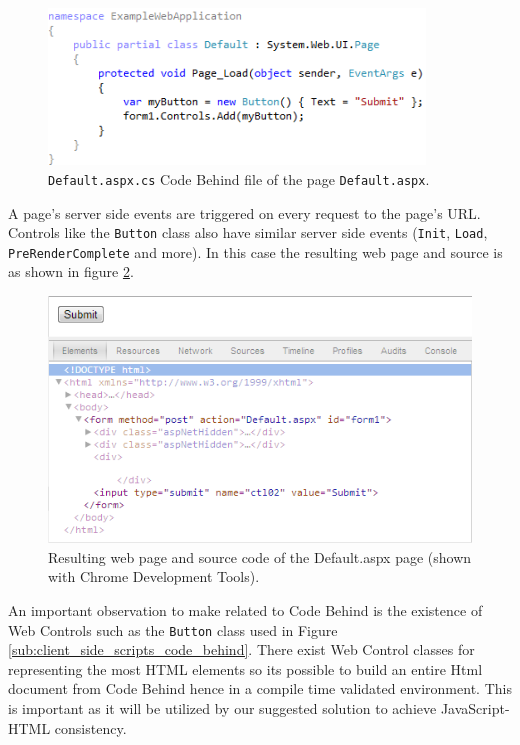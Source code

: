 				\begin{figure}[H]
					\includegraphics[width=10cm]{resources/images/CodeBehind.png}
				\caption{\texttt{Default.aspx.cs} Code Behind file of the page \texttt{Default.aspx}.}
				\label{codeBehind}
			\end{figure}
		
		A page's server side events are triggered on every request to the page's URL. Controls like the \texttt{Button} class also have similar server side events (\texttt{Init}, \texttt{Load}, \texttt{PreRenderComplete} and more). In this case the resulting web page and source is as shown in figure \ref{html}.

				\begin{figure}[H]
					\includegraphics[width=12cm]{resources/images/Html.png}
				\caption{Resulting web page and source code of the Default.aspx page (shown with Chrome Development Tools).}
				\label{html}
			\end{figure}

		An important observation to make related to Code Behind is the existence of Web Controls such as the \texttt{Button} class used in Figure \ref{sub:client_side_scripts_code_behind}. There exist Web Control classes for representing the most HTML elements so its possible to build an entire Html document from Code Behind hence in a compile time validated environment. This is important as it will be utilized by our suggested solution to achieve JavaScript-HTML consistency.

